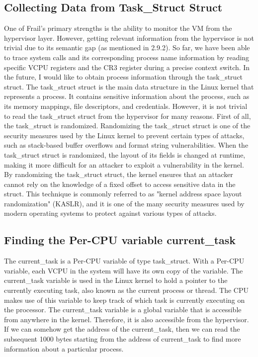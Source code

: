 \documentclass{report}
\begin{document}
\begin{spacing}{1.5}
\section{Collecting Data from Task\_Struct Struct}


{\large
One of Frail's primary strengths is the ability to monitor the VM from the hypervisor layer. However, getting relevant information from the hypervisor is not trivial due to its semantic gap (as mentioned in 2.9.2). So far, we have been able to trace system calls and its corresponding process name information by reading specific VCPU registers and the CR3 register during a precise context switch. In the future, I would like to obtain process information through the task\_struct struct. The task\_struct struct is the main data structure in the Linux kernel that represents a process. It contains sensitive information about the process, such as its memory mappings, file descriptors, and credentials. However, it is not trivial to read the task\_struct struct from the hypervisor for many reasons. First of all, the task\_struct is randomized. Randomizing the task\_struct struct is one of the security measures used by the Linux kernel to prevent certain types of attacks, such as stack-based buffer overflows and format string vulnerabilities. When the task\_struct struct is randomized, the layout of its fields is changed at runtime, making it more difficult for an attacker to exploit a vulnerability in the kernel. By randomizing the task\_struct struct, the kernel ensures that an attacker cannot rely on the knowledge of a fixed offset to access sensitive data in the struct. This technique is commonly referred to as "kernel address space layout randomization" (KASLR), and it is one of the many security measures used by modern operating systems to protect against various types of attacks.
\newline
}


\subsection{Finding the Per-CPU variable current\_task}
{\large
The current\_task is a Per-CPU variable of type task\_struct. With a Per-CPU variable, each VCPU in the system will have its own copy of the variable. The current\_task variable is used in the Linux kernel to hold a pointer to the currently executing task, also known as the current process or thread. The CPU makes use of this variable to keep track of which task is currently executing on the processor. The current\_task variable is a global variable that is accessible from anywhere in the kernel. Therefore, it is also accessible from the hypervisor. If we can somehow get the address of the current\_task, then we can read the subsequent 1000 bytes starting from the address of current\_task to find more information about a particular process.
\newline
}


\end{spacing}
\end{document}
